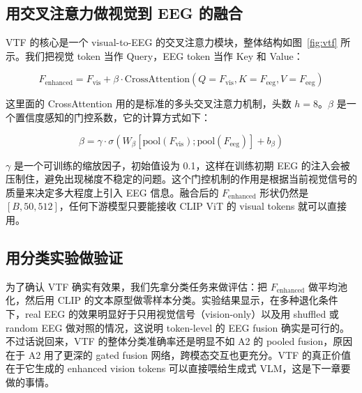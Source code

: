 \subsection{用交叉注意力做视觉到 EEG 的融合}

VTF 的核心是一个 visual-to-EEG 的交叉注意力模块，整体结构如图~\ref{fig:vtf} 所示。我们把视觉 token 当作 Query，EEG token 当作 Key 和 Value：

\begin{equation}
  F_{\mathrm{enhanced}} = F_{\mathrm{vis}} + \beta \cdot \mathrm{CrossAttention}(Q=F_{\mathrm{vis}}, K=F_{\mathrm{eeg}}, V=F_{\mathrm{eeg}})
\end{equation}


这里面的 CrossAttention 用的是标准的多头交叉注意力机制，头数 $h=8$。$\beta$ 是一个置信度感知的门控系数，它的计算方式如下：

\begin{equation}
  \beta = \gamma \cdot \sigma\left(W_\beta [\mathrm{pool}(F_{\mathrm{vis}}); \mathrm{pool}(F_{\mathrm{eeg}})] + b_\beta\right)
\end{equation}

$\gamma$ 是一个可训练的缩放因子，初始值设为 0.1，这样在训练初期 EEG 的注入会被压制住，避免出现梯度不稳定的问题。这个门控机制的作用是根据当前视觉信号的质量来决定多大程度上引入 EEG 信息。融合后的 $F_{\mathrm{enhanced}}$ 形状仍然是 $[B, 50, 512]$，任何下游模型只要能接收 CLIP ViT 的 visual tokens 就可以直接用。

\subsection{用分类实验做验证}

为了确认 VTF 确实有效果，我们先拿分类任务来做评估：把 $F_{\mathrm{enhanced}}$ 做平均池化，然后用 CLIP 的文本原型做零样本分类。实验结果显示，在多种退化条件下，real EEG 的效果明显好于只用视觉信号（vision-only）以及用 shuffled 或 random EEG 做对照的情况，这说明 token-level 的 EEG fusion 确实是可行的。不过话说回来，VTF 的整体分类准确率还是明显不如 A2 的 pooled fusion，原因在于 A2 用了更深的 gated fusion 网络，跨模态交互也更充分。VTF 的真正价值在于它生成的 enhanced vision tokens 可以直接喂给生成式 VLM，这是下一章要做的事情。
